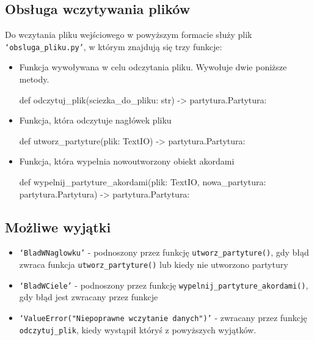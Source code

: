 \documentclass[dokumentacja.tex]{subfiles}
\begin{document}
\subsection{Obsługa wczytywania plików}
Do wczytania pliku wejściowego w powyższym formacie służy plik \texttt{`obsluga\_pliku.py'}, w którym znajdują się trzy funkcje:
\begin{itemize}
    \item Funkcja wywoływana w celu odczytania pliku. Wywołuje dwie poniższe metody. \begin{python}
def odczytuj_plik(sciezka_do_pliku: str) -> partytura.Partytura:
    \end{python}
    \item Funkcja, która odczytuje nagłówek pliku \begin{python}
def utworz_partyture(plik: TextIO) -> partytura.Partytura:
    \end{python}
    \item Funkcja, która wypełnia nowoutworzony obiekt akordami\begin{python}
def wypelnij_partyture_akordami(plik: TextIO, nowa_partytura: partytura.Partytura) -> partytura.Partytura:
    \end{python} 
\end{itemize}

\subsection{Możliwe wyjątki}
\begin{itemize}
    \item \texttt{`BladWNaglowku'} - podnoszony przez funkcję \texttt{utworz\_partyture()}, gdy błąd zwraca funkcja \texttt{utworz\_partyture()} lub kiedy nie utworzono partytury
    \item \texttt{`BladWCiele'} - podnoszony przez funkcję \texttt{wypelnij\_partyture\_akordami()}, gdy błąd jest zwracany przez funkcje \texttt{}
    \item \texttt{`ValueError("Niepoprawne wczytanie danych")'} - zwracany przez funkcję \texttt{odczytuj\_plik}, kiedy wystąpił któryś z powyższych wyjątków. 
\end{itemize}
\end{document}
